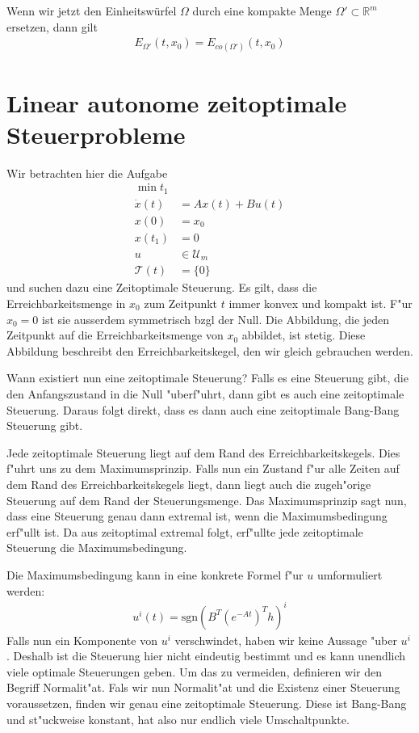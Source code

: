 \documentclass[pdftex,a4paper,oneside]{scrbook}
\begin{document}
	Wenn wir jetzt den Einheitswürfel $\Omega$ durch eine kompakte Menge $\Omega ' \subset \mathbb{R}^m$ ersetzen, dann gilt
	\begin{align*}
	E_{\Omega'}(t,x_0) = E_{co(\Omega')} (t,x_0)
	\end{align*} 

\section{Linear autonome zeitoptimale Steuerprobleme}

Wir betrachten hier die Aufgabe
\begin{align*}
	\min t_1 \\
	\dot{x}(t) & = A x(t) + B u(t) \\
	x(0) & = x_0 \\
	x(t_1) & = 0\\
	u & \in \mathcal{U}_m \\
	\mathcal{T}(t) & = \{ 0\}
\end{align*}
und suchen dazu eine Zeitoptimale Steuerung. Es gilt, dass die Erreichbarkeitsmenge in $x_0$ zum Zeitpunkt $t$ immer konvex und kompakt ist. F"ur $x_0=0$ ist sie ausserdem symmetrisch bzgl der Null. Die Abbildung, die jeden Zeitpunkt auf die Erreichbarkeitsmenge von $x_0$ abbildet, ist stetig. Diese Abbildung beschreibt den Erreichbarkeitskegel, den wir gleich gebrauchen werden.  


Wann existiert nun eine zeitoptimale Steuerung? Falls es eine Steuerung gibt, die den Anfangszustand in die Null "uberf"uhrt, dann gibt es auch eine zeitoptimale Steuerung. Daraus folgt direkt, dass es dann auch eine zeitoptimale Bang-Bang Steuerung gibt. 


Jede zeitoptimale Steuerung liegt auf dem Rand des Erreichbarkeitskegels. 
Dies f"uhrt uns zu dem Maximumsprinzip. Falls nun ein Zustand f"ur alle Zeiten auf dem Rand des Erreichbarkeitskegels liegt, dann liegt auch die zugeh"orige Steuerung auf dem Rand der Steuerungsmenge. Das Maximumsprinzip sagt nun, dass eine Steuerung genau dann extremal ist, wenn die Maximumsbedingung erf"ullt ist. Da aus zeitoptimal extremal folgt, erf"ullte jede zeitoptimale Steuerung die Maximumsbedingung. 

Die Maximumsbedingung kann in eine konkrete Formel f"ur $u$ umformuliert werden:
\begin{align*}
	u^i(t) = \text{sgn} (B^T (e^{-At})^T h)^i
\end{align*}
Falls nun ein Komponente von  $u^i$ verschwindet, haben wir keine Aussage "uber $u^i$. Deshalb ist die Steuerung hier nicht eindeutig bestimmt und es kann unendlich viele optimale Steuerungen geben. Um das zu vermeiden, definieren wir den Begriff Normalit"at. Fals wir nun Normalit"at und die Existenz einer Steuerung voraussetzen, finden wir genau eine zeitoptimale Steuerung. Diese ist Bang-Bang und st"uckweise konstant, hat also nur endlich viele Umschaltpunkte. 
\end{document}
